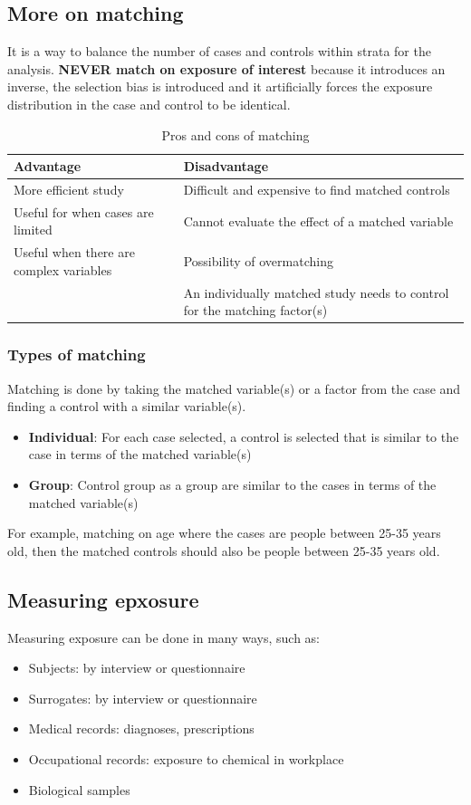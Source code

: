 \documentclass{article}
\begin{document}
\subsection*{More on matching}
It is a way to balance the number of cases and controls within strata for the analysis. \textbf{NEVER match on exposure of interest} because it introduces an inverse, the selection bias is introduced and it artificially forces the exposure distribution in the case and control to be identical.
\begin{table}[H]
\centering
\begin{tabularx}{\textwidth}{|X|X|}
\hline
\textbf{Advantage} & \textbf{Disadvantage} \\ \hline
More efficient study & Difficult and expensive to find matched controls \\ \hline
Useful for when cases are limited & Cannot evaluate the effect of a matched variable \\ \hline
Useful when there are complex variables & Possibility of overmatching \\ \hline
& An individually matched study needs to control for the matching factor(s) \\ \hline
\end{tabularx}
\caption{Pros and cons of matching}
\label{tab:pros-cons-matching}
\end{table}

\subsubsection*{Types of matching}
Matching is done by taking the matched variable(s) or a factor from the case and finding a control with a similar variable(s).
\begin{itemize}
    \item \textbf{Individual}: For each case selected, a control is selected that is similar to the case in terms of the matched variable(s)
    \item \textbf{Group}: Control group as a group are similar to the cases in terms of the matched variable(s)
\end{itemize}
For example, matching on age where the cases are people between 25-35 years old, then the matched controls should also be people between 25-35 years old.

\subsection*{Measuring epxosure}
Measuring exposure can be done in many ways, such as:
\begin{itemize}
    \item Subjects: by interview or questionnaire
    \item Surrogates: by interview or questionnaire
    \item Medical records: diagnoses, prescriptions
    \item Occupational records: exposure to chemical in workplace
    \item Biological samples
\end{itemize}
\end{document}
